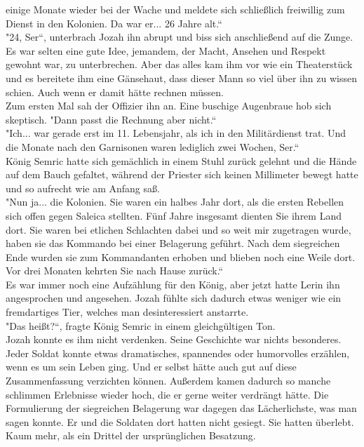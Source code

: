 einige Monate wieder bei der Wache und meldete sich schließlich freiwillig zum Dienst in den 
Kolonien. Da war er... 26 Jahre alt.``\\
"24, Ser``, unterbrach Jozah ihn abrupt und biss sich anschließend auf die Zunge. Es war selten 
eine gute Idee, jemandem, der Macht, Ansehen und Respekt gewohnt war, zu unterbrechen. Aber das 
alles kam ihm vor wie ein Theaterstück und es bereitete ihm eine Gänsehaut, dass dieser Mann so viel 
über ihn zu wissen schien. Auch wenn er damit hätte rechnen müssen.\\
Zum ersten Mal sah der Offizier ihn an. Eine buschige Augenbraue hob sich skeptisch. "Dann passt 
die Rechnung aber nicht.``\\
"Ich... war gerade erst im 11. Lebensjahr, als ich in den Militärdienst trat. Und die Monate nach 
den Garnisonen waren lediglich zwei Wochen, Ser.``\\
König Semric hatte sich gemächlich in einem Stuhl zurück gelehnt und die Hände auf dem Bauch 
gefaltet, während der Priester sich keinen Millimeter bewegt hatte und so aufrecht wie am Anfang 
saß. \\
"Nun ja... die Kolonien. Sie waren ein halbes Jahr dort, als die ersten Rebellen sich offen gegen 
Saleica stellten. Fünf Jahre insgesamt dienten Sie ihrem Land dort. Sie waren bei etlichen 
Schlachten dabei und so weit mir zugetragen wurde, haben sie das Kommando bei einer Belagerung 
geführt. Nach dem siegreichen Ende wurden sie zum Kommandanten erhoben und blieben noch eine Weile 
dort. Vor drei Monaten kehrten Sie nach Hause zurück.``\\
Es war immer noch eine Aufzählung für den König, aber jetzt hatte Lerin ihn angesprochen und 
angesehen. Jozah fühlte sich dadurch etwas weniger wie ein fremdartiges Tier, welches man 
desinteressiert anstarrte. \\
"Das heißt?``, fragte König Semric in einem gleichgültigen Ton. \\
Jozah konnte es ihm nicht verdenken. Seine Geschichte war nichts besonderes. Jeder Soldat konnte 
etwas dramatisches, spannendes oder humorvolles erzählen, wenn es um sein Leben ging. Und er selbst 
hätte auch gut auf diese Zusammenfassung verzichten können. Außerdem kamen dadurch so manche 
schlimmen Erlebnisse wieder hoch, die er gerne weiter verdrängt hätte. Die Formulierung der 
siegreichen Belagerung war dagegen das Lächerlichste, was man sagen konnte. Er und die Soldaten dort 
hatten nicht gesiegt. Sie hatten überlebt. Kaum mehr, als ein Drittel der ursprünglichen Besatzung. 
